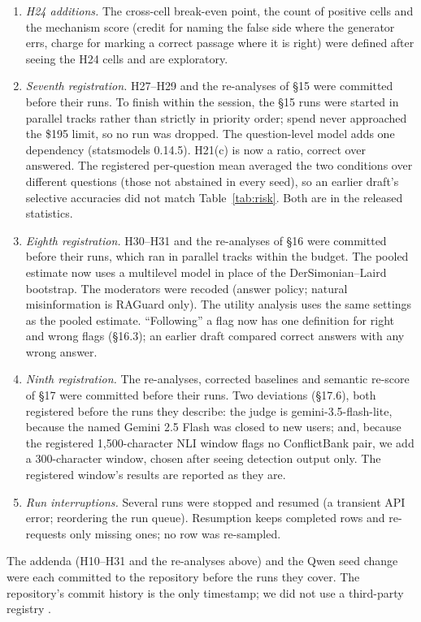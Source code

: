 \begin{enumerate}[leftmargin=*,itemsep=1pt,topsep=2pt]
only $p$-values at their floor, and only lowers them.
\item \emph{H24 additions.} The cross-cell break-even point, the count of positive cells and the mechanism score
(credit for naming the false side where the generator errs, charge for marking a correct passage where it is right)
were defined after seeing the H24 cells and are exploratory.
\item \emph{Seventh registration.} H27--H29 and the re-analyses of \S15 were committed before their runs. To finish
within the session, the \S15 runs were started in parallel tracks rather than strictly in priority order; spend never
approached the \$195 limit, so no run was dropped. The question-level model adds one dependency (statsmodels 0.14.5).
H21(c) is now a ratio, correct over answered. The registered per-question mean averaged the two conditions
over different questions (those not abstained in every seed), so an earlier draft's selective accuracies did
not match Table~\ref{tab:risk}. Both are in the released statistics.
\item \emph{Eighth registration.} H30--H31 and the re-analyses of \S16 were committed before their runs, which
ran in parallel tracks within the budget. The pooled estimate now uses a multilevel model in place of the
DerSimonian--Laird bootstrap. The moderators were recoded (answer policy; natural misinformation is RAGuard only).
The utility analysis uses the same settings as the pooled estimate. ``Following'' a flag now has one definition for
right and wrong flags (\S16.3); an earlier draft compared correct answers with any wrong answer.
\item \emph{Ninth registration.} The re-analyses, corrected baselines and semantic re-score of \S17 were committed
before their runs. Two deviations (\S17.6), both registered before the runs they describe: the judge is
gemini-3.5-flash-lite, because the named Gemini 2.5 Flash was closed to new users; and, because the registered
1,500-character NLI window flags no ConflictBank pair, we add a 300-character window, chosen after seeing
detection output only. The registered window's results are reported as they are.
\item \emph{Run interruptions.} Several runs were stopped and resumed (a transient API error; reordering the run
queue). Resumption keeps completed rows and re-requests only missing ones; no row was re-sampled.
\end{enumerate}
The addenda (H10--H31 and the re-analyses above) and the Qwen seed change were each committed to the repository before
the runs they cover. The repository's commit history is the only timestamp; we did not use a third-party registry
\citep{vanmiltenburg2021preregistering}.

